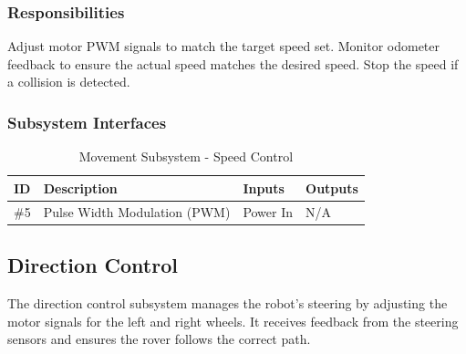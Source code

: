 \subsubsection{Responsibilities}
Adjust motor PWM signals to match the target speed set. Monitor odometer feedback to ensure the actual speed matches the desired speed. Stop the speed if a collision is detected.

\subsubsection{Subsystem Interfaces}

\begin {table}[H]
\caption {Movement Subsystem - Speed Control} 
\begin{center}
    \begin{tabular}{ | p{1cm} | p{6cm} | p{3cm} | p{3cm} |}
    \hline
    ID & Description & Inputs & Outputs \\ \hline
    \#5 & Pulse Width Modulation (PWM) & Power In & N/A \\ \hline
    \end{tabular}
\end{center}
\end{table}

\newpage


\subsection{Direction Control}
The direction control subsystem manages the robot's steering by adjusting the motor signals for the left and right wheels. It receives feedback from the steering sensors and ensures the rover follows the correct path.

